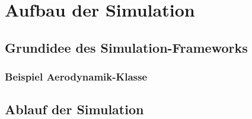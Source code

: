 \chapter{Aufbau der Simulation}
\section{Grundidee des Simulation-Frameworks}

\subsection{Beispiel Aerodynamik-Klasse }
\section{Ablauf der Simulation}
